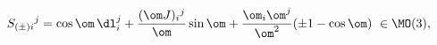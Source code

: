 \begin{equation}                                        \label{elsogt}
  S_{(\pm)i}{}^j=\cos\om\,\dl_i^j+\frac{(\om J)_i{}^j}\om\sin\om
  +\frac{\om_i\om^j}{\om^2}(\pm1-\cos\om)~\in\MO(3),
\end{equation}


